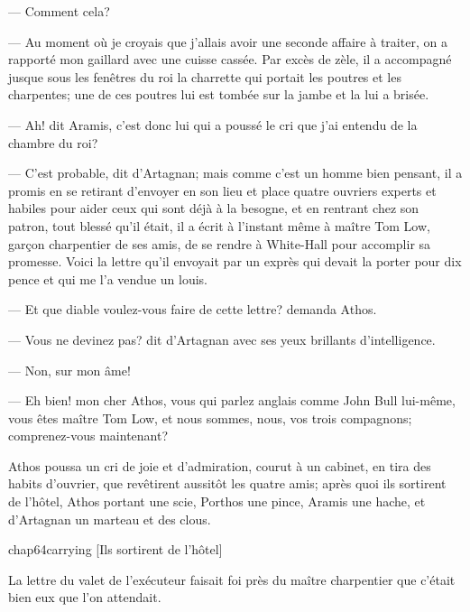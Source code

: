 — Comment cela?

— Au moment où je croyais que j'allais avoir une seconde affaire à traiter, on a rapporté mon gaillard avec une cuisse cassée. Par excès de zèle, il a accompagné jusque sous les fenêtres du roi la charrette qui portait les poutres et les charpentes; une de ces poutres lui est tombée sur la jambe et la lui a brisée.

— Ah! dit Aramis, c'est donc lui qui a poussé le cri que j'ai entendu de la chambre du roi?

— C'est probable, dit d'Artagnan; mais comme c'est un homme bien pensant, il a promis en se retirant d'envoyer en son lieu et place quatre ouvriers experts et habiles pour aider ceux qui sont déjà à la besogne, et en rentrant chez son patron, tout blessé qu'il était, il a écrit à l'instant même à maître Tom Low, garçon charpentier de ses amis, de se rendre à White-Hall pour accomplir sa promesse. Voici la lettre qu'il envoyait par un exprès qui devait la porter pour dix pence et qui me l'a vendue un louis.

— Et que diable voulez-vous faire de cette lettre? demanda Athos.

— Vous ne devinez pas? dit d'Artagnan avec ses yeux brillants d'intelligence.

— Non, sur mon âme!

— Eh bien! mon cher Athos, vous qui parlez anglais comme John Bull lui-même, vous êtes maître Tom Low, et nous sommes, nous, vos trois compagnons; comprenez-vous maintenant?

Athos poussa un cri de joie et d'admiration, courut à un cabinet, en tira des habits d'ouvrier, que revêtirent aussitôt les quatre amis; après quoi ils sortirent de l'hôtel, Athos portant une scie, Porthos une pince, Aramis une hache, et d'Artagnan un marteau et des clous.

\begin{bwbigpic}
	[\basicscale] 
	{chap64carrying}
	[Ils sortirent de l'hôtel]
\end{bwbigpic}

La lettre du valet de l'exécuteur faisait foi près du maître charpentier que c'était bien eux que l'on attendait.